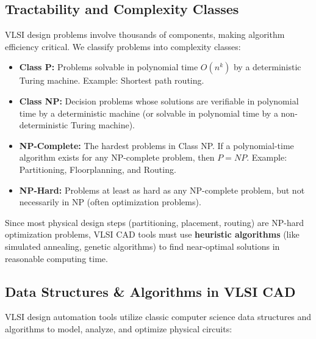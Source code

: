 \documentclass[12pt,a4paper]{article}
\begin{document}
\subsection{Tractability and Complexity Classes}
VLSI design problems involve thousands of components, making algorithm efficiency critical. We classify problems into complexity classes:
\begin{itemize}[leftmargin=*, itemsep=2pt]
  \item \textbf{Class P:} Problems solvable in polynomial time $O(n^k)$ by a deterministic Turing machine. Example: Shortest path routing.
  \item \textbf{Class NP:} Decision problems whose solutions are verifiable in polynomial time by a deterministic machine (or solvable in polynomial time by a non-deterministic Turing machine).
  \item \textbf{NP-Complete:} The hardest problems in Class NP. If a polynomial-time algorithm exists for any NP-complete problem, then $P = NP$. Example: Partitioning, Floorplanning, and Routing.
  \item \textbf{NP-Hard:} Problems at least as hard as any NP-complete problem, but not necessarily in NP (often optimization problems).
\end{itemize}

Since most physical design steps (partitioning, placement, routing) are NP-hard optimization problems, VLSI CAD tools must use \textbf{heuristic algorithms} (like simulated annealing, genetic algorithms) to find near-optimal solutions in reasonable computing time.

\subsection{Data Structures \& Algorithms in VLSI CAD}
VLSI design automation tools utilize classic computer science data structures and algorithms to model, analyze, and optimize physical circuits:
\end{document}
